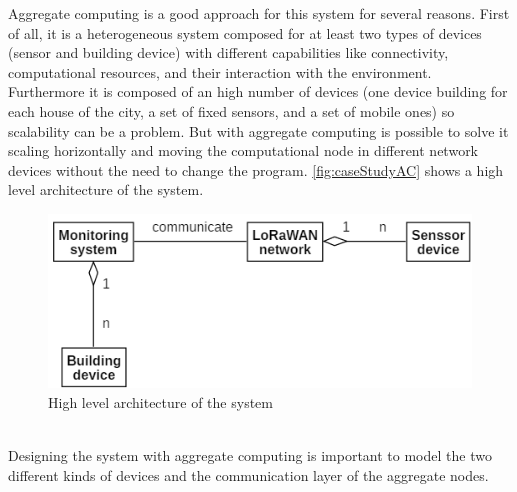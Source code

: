 Aggregate computing is a good approach for this system for several reasons.
First of all, it is a heterogeneous system composed for at least two types of devices (sensor and building device) with different capabilities like connectivity, computational resources, and their interaction with the environment. 
Furthermore it is composed of an high number of devices (one device building for each house of the city, a set of fixed sensors, and a set of mobile ones) so scalability can be a problem. But with aggregate computing is possible to solve it scaling horizontally and moving the computational node in different network devices without the need to change the program.
\autoref{fig:caseStudyAC} shows a high level architecture of the system.
\begin{figure}[h]
    \centering
    \includegraphics{figures/caseStudyB_high.png}
    \caption[High level architecture of the system (case study 2)]{High level architecture of the system}
    \label{fig:caseStudyAC}
\end{figure}
\\Designing the system with aggregate computing is important to model the two different kinds of devices and the communication layer of the aggregate nodes.

